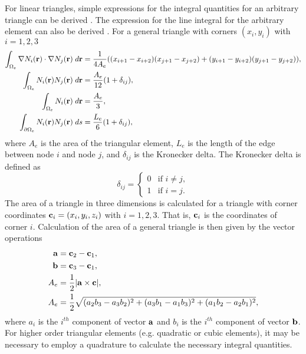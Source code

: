       For linear triangles, simple expressions for the integral quantities for
      an arbitrary triangle can be derived \cite{textbookwhite}. The expression
      for the line integral for the arbitrary element can also be derived
      \cite{computerLab}. For a general triangle with corners $( x_i,y_i )$ with
      $i=1,2,3$
      \begin{align}
        \int_{\Omega_e} \mathbf{\nabla} N_i(\mathbf{r}) \cdot \mathbf{\nabla} N_j(\mathbf{r}) 
          \;d\mathbf{r} &= \frac{1}{4 A_e}
          ((x_{i+1}-x_{i+2})(x_{j+1}-x_{j+2}) + 
          (y_{i+1}-y_{i+2})(y_{j+1}-y_{j+2})), \\
        \int_{\Omega_e} N_i(\mathbf{r}) N_j(\mathbf{r}) \;d\mathbf{r} &= 
          \frac{A_e}{12} (1+\delta_{ij}), \\
        \int_{\Omega_e} N_i(\mathbf{r}) \;d\mathbf{r} &= \frac{A_e}{3}, \\
        \int_{\partial \Omega_e} N_i(\mathbf{r}) N_j(\mathbf{r}) \;ds &=
          \frac{L_e}{6}(1+\delta_{ij}), 
      \end{align}
      where $A_e$ is the area of the triangular element, $L_e$ is the length of 
      the edge between node $i$ and node $j$, and $\delta_{ij}$ is the Kronecker
      delta.
      The Kronecker delta is defined as
      \begin{equation} \label{eq:kroneker_delta}
        \delta_{ij} =
        \begin{cases}
          0 & \text{if } i \ne j, \\
          1 & \text{if } i = j.
        \end{cases}
      \end{equation}
      The area of a triangle in three dimensions is calculated for a triangle
      with corner coordinates $\mathbf{c}_i = (x_i, y_i, z_i)$ with $i=1,2,3$.
      That is, $\mathbf{c}_i$ is the coordinates of corner $i$. Calculation of the area
      of a general triangle is then given by the vector operations
      \begin{align}
        \mathbf{a} &= \mathbf{c}_2 - \mathbf{c}_1, \\
        \mathbf{b} &= \mathbf{c}_3 - \mathbf{c}_1, \\
        A_e &= \frac{1}{2} \lvert \mathbf{a} \times \mathbf{c} \rvert, \\
        \label{eq:area_triangle}
        A_e &= \frac{1}{2} \sqrt{ (a_2 b_3 - a_3 b_2)^2 + (a_3 b_1 - a_1 b_3)^2 +
          (a_1 b_2 - a_2 b_1)^2},
      \end{align}
      where $a_i$ is the $i^{th}$ component of vector $\mathbf{a}$ and $b_i$ is the
      $i^{th}$ component of vector $\mathbf{b}$.  For higher order triangular elements
      (e.g. quadratic or cubic elements), it may be necessary to employ a
      quadrature to calculate the necessary integral quantities.


